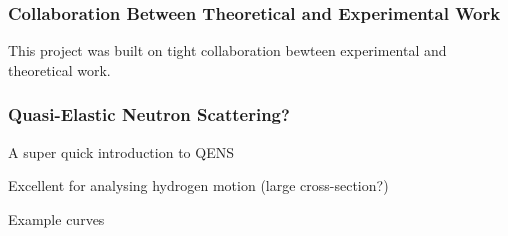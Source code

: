 \subsubsection{Collaboration Between Theoretical and Experimental Work}
\label{sec:cooperation}

This project was built on tight collaboration bewteen experimental and theoretical work.

\placeholder

\subsubsection{Quasi-Elastic Neutron Scattering?}
\label{sec:qens}
\bit
\item A super quick introduction to QENS
\item Excellent for analysing hydrogen motion (large cross-section?)
\item Example curves
\eit

\placeholder

